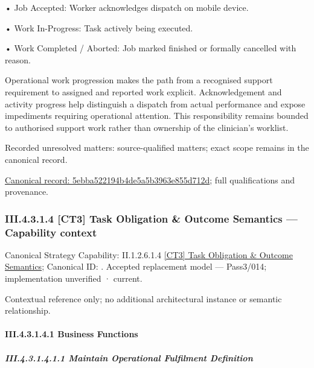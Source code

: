 •
Job Accepted: Worker acknowledges dispatch on mobile device.



•
Work In-Progress: Task actively being executed.



•
Work Completed / Aborted: Job marked finished or formally cancelled with reason.



Operational work progression makes the path from a recognised support requirement to assigned and reported work explicit. Acknowledgement and activity progress help distinguish a dispatch from actual performance and expose impediments requiring operational attention. This responsibility remains bounded to authorised support work rather than ownership of the clinician's worklist.


{\small Recorded unresolved matters: source-qualified matters; exact scope remains in the canonical record.}\par
{\footnotesize \href{../../../../../../../../continuum/business/business-process/5ebba522194b4de5a5b3963e855d712d.md}{Canonical record: 5ebba522194b4de5a5b3963e855d712d}; full qualifications and provenance.}\par
\subsubsection*{III.4.3.1.4 [CT3] Task Obligation \& Outcome Semantics — Capability context}
\label{navigation:III.4.3.1.4}

{\small Canonical Strategy Capability: II.1.2.6.1.4 \hyperref[element:aa301a98cf30454889f1eec8f0a742ab]{[CT3] Task Obligation \& Outcome Semantics}; Canonical ID: \texttt{}. Accepted replacement model — Pass3/014; implementation unverified · current.}\par
Contextual reference only; no additional architectural instance or semantic relationship.\par
\paragraph*{III.4.3.1.4.1 Business Functions}
\label{navigation:III.4.3.1.4.1}

\subparagraph*{III.4.3.1.4.1.1 Maintain Operational Fulfilment Definition}
\label{navigation:III.4.3.1.4.1.1}

